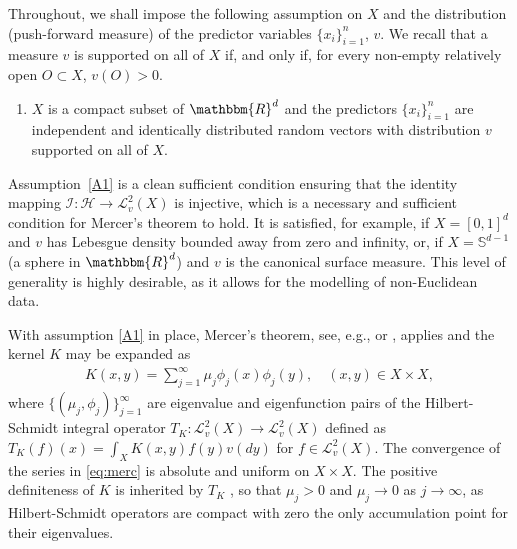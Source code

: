 \documentclass[11pt]{article}
\theoremstyle{definition}
\theoremstyle{remark}
\begin{document}
Throughout, we shall impose the following assumption on $X$ and the distribution (push-forward measure) of the predictor variables $\{x_i\}_{i=1}^n$, $v$. We recall that a measure $v$ is supported on all of $X$ if, and only if, for every non-empty relatively open $O \subset X$, $v(O)>0$.

\begin{enumerate}[label=(A\arabic*), ref=(A\arabic*)]
\item \label{A1} $X$ is a compact subset of $\mathbbm{R}^d$ and the predictors $\{x_i\}_{i=1}^n$ are independent and identically distributed random vectors with distribution $v$ supported on all of $X$.
\end{enumerate}
\noindent
Assumption~\ref{A1} is a clean sufficient condition ensuring that the identity mapping $\mathcal{I}: \mathcal{H} \to \mathcal{L}^2_v(X)$ is injective, which is a necessary and sufficient condition for Mercer's theorem to hold. It is satisfied, for example, if $X = [0,1]^d$ and $v$ has Lebesgue density bounded away from zero and infinity, or, if $X = \mathbb{S}^{d-1}$ (a sphere in $\mathbbm{R}^d$) and $v$ is the canonical surface measure. This level of generality is highly desirable, as it allows for the modelling of non-Euclidean data.

With assumption \ref{A1}	 in place, Mercer's theorem, see, e.g., \citep[Theorem 12.20]{Wain:2019} or \citep[Corollary 3.5]{St:2012}, applies and the kernel $K$ may be expanded as
\begin{align}
\label{eq:merc}
K(x,y) = \sum_{j=1}^{\infty} \mu_j \phi_j(x) \phi_j(y), \quad (x,y) \in X \times X,
\end{align}
where $\{(\mu_j, \phi_j)\}_{j=1}^{\infty}$ are eigenvalue and eigenfunction pairs of the Hilbert-Schmidt integral operator $T_K : \mathcal{L}^2_v(X) \to \mathcal{L}^2_v(X)$ defined as $T_K(f)(x) = \int_{X} K(x,y) f(y) v(dy)$ for $f \in \mathcal{L}^2_v(X)$. The convergence of the series in \eqref{eq:merc} is absolute and uniform on $X \times X$. The positive definiteness of $K$ is inherited by $T_K$ \citep[see, e.g.][Theorem 4.6.4]{Hsing:2015}, so that $\mu_j>0$ and $\mu_j \to 0$ as $j \to \infty$, as Hilbert-Schmidt operators are compact with zero the only accumulation point for their eigenvalues. 
\end{document}
